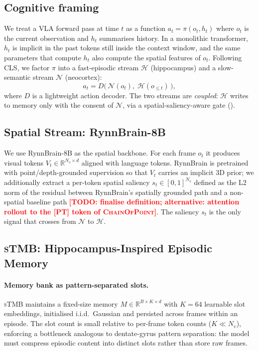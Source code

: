 \documentclass[10pt,letterpaper]{article}
\newcommand{\todo}[1]{\textcolor{red}{\textbf{[TODO: #1]}}}
\newcommand{\sTMB}{\textsc{sTMB}\xspace}
\begin{document}
\subsection{Cognitive framing}
\label{sec:framing}
We treat a VLA forward pass at time $t$ as a function $a_t = \pi(o_t, h_t)$ where $o_t$ is the current observation and $h_t$ summarises history. In a monolithic transformer, $h_t$ is implicit in the past tokens still inside the context window, and the same parameters that compute $h_t$ also compute the spatial features of $o_t$. Following CLS, we factor $\pi$ into a fast-episodic stream $\mathcal{H}$ (hippocampus) and a slow-semantic stream $\mathcal{N}$ (neocortex):
\begin{equation}
    a_t = D\bigl(\,\mathcal{N}(o_t),\; \mathcal{H}(o_{\le t})\,\bigr),
\end{equation}
where $D$ is a lightweight action decoder. The two streams are \emph{coupled}: $\mathcal{H}$ writes to memory only with the consent of $\mathcal{N}$, via a spatial-saliency-aware gate ().

\subsection{Spatial Stream: RynnBrain-8B}
\label{sec:spatial}
We use RynnBrain-8B as the spatial backbone. For each frame $o_t$ it produces visual tokens $V_t \in \mathbb{R}^{N_v \times d}$ aligned with language tokens. RynnBrain is pretrained with point/depth-grounded supervision so that $V_t$ carries an implicit 3D prior; we additionally extract a per-token spatial saliency $s_t \in [0,1]^{N_v}$ defined as the L2 norm of the residual between RynnBrain's spatially grounded path and a non-spatial baseline path \todo{finalise definition; alternative: attention rollout to the [PT] token of \textsc{ChainOfPoint}}. The saliency $s_t$ is the only signal that crosses from $\mathcal{N}$ to $\mathcal{H}$.

\subsection{\sTMB: Hippocampus-Inspired Episodic Memory}
\label{sec:stmb}

\paragraph{Memory bank as pattern-separated slots.}
\sTMB maintains a fixed-size memory $M \in \mathbb{R}^{B \times K \times d}$ with $K=64$ learnable slot embeddings, initialised i.i.d.\ Gaussian and persisted across frames within an episode. The slot count is small relative to per-frame token counts ($K \ll N_v$), enforcing a bottleneck analogous to dentate-gyrus pattern separation: the model must compress episodic content into distinct slots rather than store raw frames.
\end{document}
